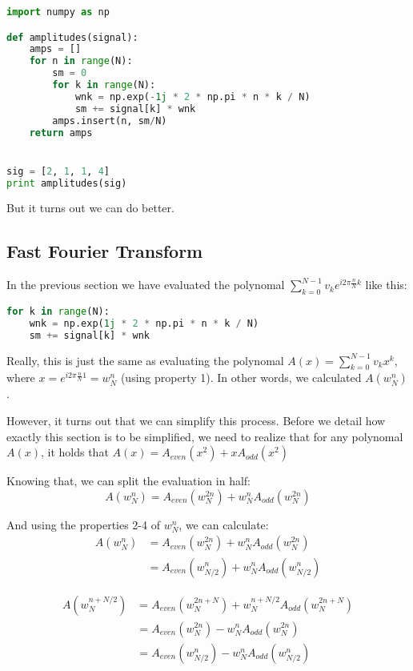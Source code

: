 \begin{lstlisting}[language=python]
import numpy as np

def amplitudes(signal):
    amps = []
    for n in range(N):
        sm = 0
        for k in range(N):
            wnk = np.exp(-1j * 2 * np.pi * n * k / N) 
            sm += signal[k] * wnk
        amps.insert(n, sm/N)
    return amps


sig = [2, 1, 1, 4]
print amplitudes(sig)
\end{lstlisting}

But it turns out we can do better. 

\subsection{Fast Fourier Transform}

In the previous section we have evaluated the polynomal $\sum_{k=0}^{N-1} v_k e^{i 2 \pi \frac{n}{N} k}$ like this:
\begin{lstlisting}[language=python]
for k in range(N):
    wnk = np.exp(1j * 2 * np.pi * n * k / N) 
    sm += signal[k] * wnk
\end{lstlisting}

Really, this is just the same as evaluating the polynomal $A(x) = \sum_{k=0}^{N-1} v_k x^k$, where $x = e^{i 2 \pi \frac{n}{N} 1} = w_N^n$ (using property 1). In other words, we calculated $A(w_N^n)$.

However, it turns out that we can simplify this process. Before we detail how exactly this section is to be simplified, we need to realize that for any polynomal $A(x)$, it holds that $A(x) = A_{even}(x^2) + x A_{odd}(x^2)$


Knowing that, we can split the evaluation in half:
$$ A(w_N^n) = A_{even}(w_N^{2n}) + w_N^n A_{odd}(w_N^{2n})$$


And using the properties 2-4 of $w_N^n$, we can calculate:
\begin{equation} 
\begin{split} 
    A(w_N^n) & = A_{even}(w_N^{2n})   + w_N^n A_{odd}(w_N^{2n})   \\
             & = A_{even}(w_{N/2}^n)  + w_N^n A_{odd}(w_{N/2}^n)
\end{split}
\end{equation}

\begin{equation} 
\begin{split}  
A(w_N^{n + N/2})  & = A_{even}(w_N^{2n+ N}) + w_N^{n+N/2} A_{odd}(w_N^{2n + N}) \\
                  & = A_{even}(w_N^{2n}) - w_N^n A_{odd}(w_N^{2n})   \\
                  & = A_{even}(w_{N/2}^n) - w_N^n A_{odd}(w_{N/2}^n)
\end{split}
\end{equation}

